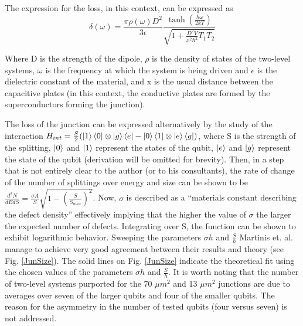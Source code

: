\documentclass[aps,prl,reprint,groupedaddress]{revtex4-1}
\begin{document}
The expression for the loss, in this context, can be expressed as \[ \delta(\omega)	 = \frac{\pi\rho(\omega) D^2}{3\epsilon} \frac{\tanh({\frac{\hbar\omega}{2kT}})}{\sqrt{1+\frac{D^2V}{x^2\hbar^2}T_1T_2}} \]

Where D is the strength of the dipole, $\rho$ is the density of states of the two-level systems, $\omega$ is the frequency at which the system is being driven and $\epsilon$ is the dielectric constant of the material, and x is the usual distance between the capacitive plates (in this context, the conductive plates are formed by the superconductors forming the junction).

The loss of the junction can be expressed alternatively by the study of the interaction $H_{int} = \frac{S}{2}(\ket{1}\bra{0}\otimes\ket{g}\bra{e}-\ket{0}\bra{1}\otimes\ket{e}\bra{g})$, where S is the strength of the splitting, $\ket{0}$ and $\ket{1}$ represent the states of the qubit, $\ket{e}$ and $\ket{g}$ represent the state of the qubit (derivation will be omitted for brevity). Then, in a step that is not entirely clear to the author (or to his consultants), the rate of change of the number of splittings over energy and size can be shown to be $\frac{d^2N}{dEdS} = \frac{\sigma A}{S} \sqrt{1-(\frac{S}{S_{max}})^2} $. Now, $\sigma$ is described as a ``materials constant describing the defect density'' effectively implying that the higher the value of $\sigma$ the larger the expected number of defects. Integrating over S, the function can be shown to exhibit logarithmic behavior. Sweeping the parameters $\sigma h$ and $\frac{S}{h}$ Martinis et. al. manage to achieve very good agreement between their results and theory (see Fig. \ref{JunSize}). The solid lines on Fig. \ref{JunSize} indicate the theoretical fit using the chosen values of the parameters $\sigma h$ and $\frac{S}{h}$. It is worth noting that the number of two-level systems purported for the 70 $\mu m^2$ and 13 $\mu m^2$ junctions are due to averages over seven of the larger qubits and four of the smaller qubits. The reason for the asymmetry in the number of tested qubits (four versus seven) is not addressed. 
\end{document}
